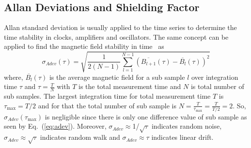  
 \subsection{Allan Deviations and Shielding Factor}
 
Allan standard deviation \cite{allan} is usually applied to the time series to determine the time stability in clocks, amplifiers and oscillators. The same concept can be applied to find the magnetic field stability in time~\cite{bea} as
\begin{equation}\label{eq:adev}
    \sigma_{Adev} (\tau)=\sqrt{\frac{1}{2(N-1)}\sum_{l=1}^{N-1} \left(\overline{B_{l+1}}(\tau)-\overline{B_l}(\tau)\right)^2}
\end{equation}
where, $\overline{B_l}(\tau)$ is the average magnetic field for a sub sample $l$ over integration time $\tau$ and $\tau = \frac{T}{N}$ with $T$ is the total measurement time and $N$ is total number of sub samples. The largest integration time for total measurement time $T$ is $\tau_{\text{max}}=T/2$ and for that the total number of sub sample is $N = \frac{T}{\tau_{\text{max}}}=\frac{T}{T/2}=2$. So, $\sigma_{Adev}(\tau_{\text{max}})$ is negligible since there is only one difference value of sub sample as seen by Eq.~(\ref{eq:adev}). Moreover, $\sigma_{Adev}\approx$1/$\sqrt{\tau}$ indicates random noise, $\sigma_{Adev}\approx \sqrt{\tau}$ indicates random walk and $\sigma_{Adev}\approx \tau$ indicates linear drift. 



